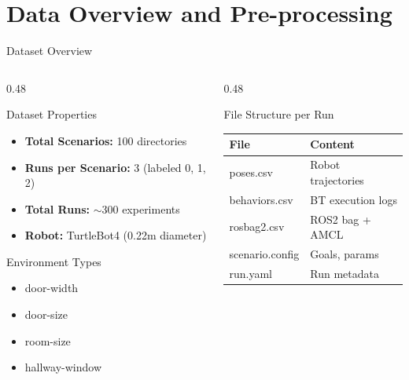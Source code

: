 \documentclass[aspectratio=169, 11pt]{beamer}
\newcommand{\fullsectiontitle}{}
\newcommand{\presentationsection}[2][]{%
  \gdef\fullsectiontitle{#2}%
  \section[#1]{#2}%
}
\begin{document}
\presentationsection[Data Overview and Pre-processing]{Data Overview and Pre-processing}

\begin{frame}{Dataset Overview}
  \begin{columns}[T]
    \begin{column}{0.48\textwidth}
      \begin{block}{Dataset Properties}
        \begin{itemize}
          \item \textbf{Total Scenarios:} 100 directories
          \item \textbf{Runs per Scenario:} 3 (labeled 0, 1, 2)
          \item \textbf{Total Runs:} $\sim$300 experiments
          \item \textbf{Robot:} TurtleBot4 (0.22m diameter)
        \end{itemize}
      \end{block}
      
      \vspace{0.3cm}
      
      \begin{block}{Environment Types}
        \begin{itemize}
          \item door-width
          \item door-size
          \item room-size
          \item hallway-window
        \end{itemize}
      \end{block}
    \end{column}
    
    \begin{column}{0.48\textwidth}
      \begin{block}{File Structure per Run}
        \footnotesize
        \begin{tabular}{@{}l l@{}}
          \toprule
          \textbf{File} & \textbf{Content} \\
          \midrule
          poses.csv & Robot trajectories \\
          behaviors.csv & BT execution logs \\
          rosbag2.csv & ROS2 bag + AMCL \\
          scenario.config & Goals, params \\
          run.yaml & Run metadata \\
          \bottomrule
        \end{tabular}
      \end{block}
    \end{column}
  \end{columns}
\end{frame}
\end{document}
